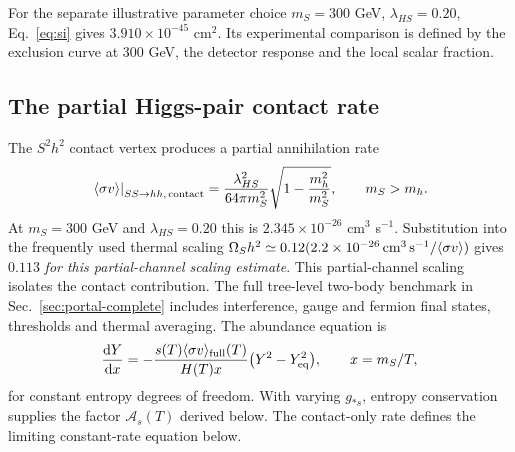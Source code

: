 For the separate illustrative parameter choice $m_S=300$ GeV, $\lambda_{HS}=0.20$, Eq.~\eqref{eq:si} gives $3.910\times10^{-45}$ cm$^2$. Its experimental comparison is defined by the exclusion curve at $300$ GeV, the detector response and the local scalar fraction.

\subsection{The partial Higgs-pair contact rate}\label{sec:contact-rate}
The $S^2h^2$ contact vertex produces a partial annihilation rate
\begin{equation}
\left.\langle\sigma v\rangle\right|_{SS\to hh,\,\rm contact}
=\frac{\lambda_{HS}^2}{64\pi m_S^2}\sqrt{1-\frac{m_h^2}{m_S^2}},\qquad m_S>m_h.
\end{equation}
At $m_S=300$ GeV and $\lambda_{HS}=0.20$ this is $2.345\times10^{-26}$ cm$^3$ s$^{-1}$. Substitution into the frequently used thermal scaling $\Omega_Sh^2\simeq0.12(2.2\times10^{-26}\,\mathrm{cm^3\,s^{-1}}/\langle\sigma v\rangle)$ gives $0.113$ \emph{for this partial-channel scaling estimate}. This partial-channel scaling isolates the contact contribution. The full tree-level two-body benchmark in Sec.~\ref{sec:portal-complete} includes interference, gauge and fermion final states, thresholds and thermal averaging. The abundance equation is
\begin{equation}
\frac{\mathrm{d} Y}{\mathrm{d} x}=-\frac{s(T)\langle\sigma v\rangle_{\rm full}(T)}{H(T)x}\bigl(Y^2-Y_{\rm eq}^2\bigr),\qquad x=m_S/T,
\end{equation}
for constant entropy degrees of freedom. With varying $g_{*s}$, entropy conservation supplies the factor $\mathcal A_s(T)$ derived below. The contact-only rate defines the limiting constant-rate equation below.

